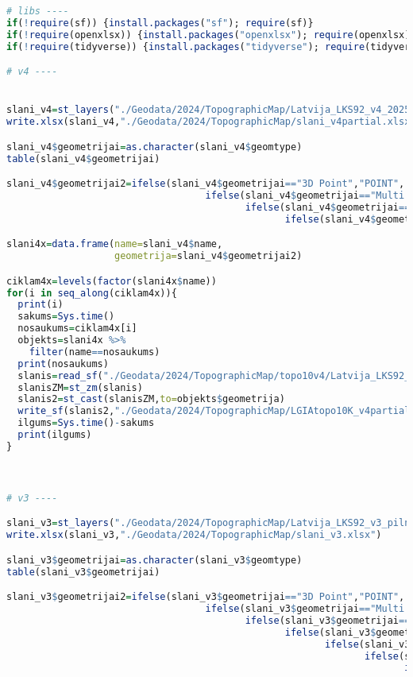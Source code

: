 \documentclass[
]{book}
\begin{document}
\begin{lstlisting}[language=R]
# libs ----
if(!require(sf)) {install.packages("sf"); require(sf)}
if(!require(openxlsx)) {install.packages("openxlsx"); require(openxlsx)}
if(!require(tidyverse)) {install.packages("tidyverse"); require(tidyverse)}

# v4 ----


slani_v4=st_layers("./Geodata/2024/TopographicMap/Latvija_LKS92_v4_20250703.gdb/")
write.xlsx(slani_v4,"./Geodata/2024/TopographicMap/slani_v4partial.xlsx")

slani_v4$geometrijai=as.character(slani_v4$geomtype)
table(slani_v4$geometrijai)

slani_v4$geometrijai2=ifelse(slani_v4$geometrijai=="3D Point","POINT",
                                   ifelse(slani_v4$geometrijai=="Multi Polygon","MULTIPOLYGON",
                                          ifelse(slani_v4$geometrijai=="3D Multi Line String","MULTILINESTRING",
                                                 ifelse(slani_v4$geometrijai=="3D Multi Polygon","MULTIPOLYGON",NA))))

slani4x=data.frame(name=slani_v4$name,
                   geometrija=slani_v4$geometrijai2)

ciklam4x=levels(factor(slani4x$name))
for(i in seq_along(ciklam4x)){
  print(i)
  sakums=Sys.time()
  nosaukums=ciklam4x[i]
  objekts=slani4x %>% 
    filter(name==nosaukums)
  print(nosaukums)
  slanis=read_sf("./Geodata/2024/TopographicMap/topo10v4/Latvija_LKS92_v4_20250703.gdb/",layer=nosaukums)
  slanisZM=st_zm(slanis)
  slanis2=st_cast(slanisZM,to=objekts$geometrija)
  write_sf(slanis2,"./Geodata/2024/TopographicMap/LGIAtopo10K_v4partial.gpkg",layer=nosaukums,append=FALSE)
  ilgums=Sys.time()-sakums
  print(ilgums)
}



# v3 ----

slani_v3=st_layers("./Geodata/2024/TopographicMap/Latvija_LKS92_v3_pilnais.gdb/")
write.xlsx(slani_v3,"./Geodata/2024/TopographicMap/slani_v3.xlsx")

slani_v3$geometrijai=as.character(slani_v3$geomtype)
table(slani_v3$geometrijai)

slani_v3$geometrijai2=ifelse(slani_v3$geometrijai=="3D Point","POINT",
                                   ifelse(slani_v3$geometrijai=="Multi Polygon","MULTIPOLYGON",
                                          ifelse(slani_v3$geometrijai=="3D Multi Line String","MULTILINESTRING",
                                                 ifelse(slani_v3$geometrijai=="3D Multi Polygon","MULTIPOLYGON",
                                                        ifelse(slani_v3$geometrijai=="Point","POINT",
                                                               ifelse(slani_v3$geometrijai=="Multi Line String","MULTILINESTRING",
                                                                      ifelse(slani_v3$geometrijai=="3D Measured Point","POINT",NA)))))))


\end{lstlisting}
\end{document}
